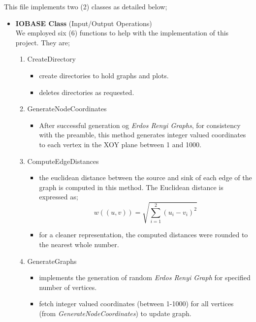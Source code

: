 \documentclass[longpaper, english, final, times]{revdetua}
\begin{document}
\begin{itemize}
			This file implements two (2) classes as detailed below; \\
			\begin{itemize}
				[topsep=1ex,itemsep=1ex,partopsep=1ex,parsep=1ex]
				\item \textbf{IOBASE Class} (Input/Output Operations) \\
					We employed six (6) functions to help with the implementation of this project. They are;
					\begin{enumerate}[label=\arabic*), topsep=0pt,itemsep=0ex,partopsep=1ex,parsep=1ex]
						\item CreateDirectory
						\begin{itemize}
							[topsep=0pt,itemsep=-1ex,partopsep=1ex,parsep=1ex]
							\item create directories to hold graphs and plots.
							\item deletes directories as requested.
						\end{itemize}
						\item GenerateNodeCoordinates
						\begin{itemize}
							[topsep=0pt,itemsep=-1ex,partopsep=1ex,parsep=1ex]
							\item After successful generation og \emph{Erdos Renyi Graphs}, for consistency with the preamble, this method generates integer valued coordinates to each vertex in the XOY plane between 1 and 1000.
						\end{itemize}
						\item ComputeEdgeDistances
						\begin{itemize}
							[topsep=0pt,itemsep=-1ex,partopsep=1ex,parsep=1ex]
							\item the euclidean distance between the source and sink of each edge of the graph is computed in this method. The Euclidean distance is expressed as;
							$$ w((u,v))=\sqrt{\sum_{i=1}^{2}(u_i-v_i)^{2}}$$
							\item for a cleaner representation, the computed distances were rounded to the nearest whole number.
						\end{itemize}
						\item GenerateGraphs
						\begin{itemize}
							[topsep=0pt,itemsep=0ex,partopsep=1ex,parsep=1ex]
							\item implements the generation of random \emph{Erdos Renyi Graph} for specified number of vertices.
							\item fetch integer valued coordinates (between 1-1000) for all vertices (from \emph{GenerateNodeCoordinates}) to update graph.

\end{itemize}
\end{enumerate}
\end{itemize}
\end{itemize}
\end{document}
